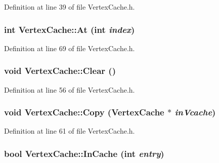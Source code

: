 Definition at line 39 of file VertexCache.h.\hypertarget{class_vertex_cache_4696b88833b6375eab111aeec93a89f3}{
\subsubsection[{At}]{\setlength{\rightskip}{0pt plus 5cm}int VertexCache::At (int {\em index})}}
\label{class_vertex_cache_4696b88833b6375eab111aeec93a89f3}




Definition at line 69 of file VertexCache.h.\hypertarget{class_vertex_cache_915a13823a5f2d0304df086edc38e985}{
\subsubsection[{Clear}]{\setlength{\rightskip}{0pt plus 5cm}void VertexCache::Clear ()}}
\label{class_vertex_cache_915a13823a5f2d0304df086edc38e985}




Definition at line 56 of file VertexCache.h.\hypertarget{class_vertex_cache_39b101c4bddc59cc8cac176a5ad3857d}{
\subsubsection[{Copy}]{\setlength{\rightskip}{0pt plus 5cm}void VertexCache::Copy ({\bf VertexCache} $\ast$ {\em inVcache})}}
\label{class_vertex_cache_39b101c4bddc59cc8cac176a5ad3857d}




Definition at line 61 of file VertexCache.h.\hypertarget{class_vertex_cache_be2ee2c8ee859aa4a0d201ab0d033b33}{
\subsubsection[{InCache}]{\setlength{\rightskip}{0pt plus 5cm}bool VertexCache::InCache (int {\em entry})}}
\label{class_vertex_cache_be2ee2c8ee859aa4a0d201ab0d033b33}




